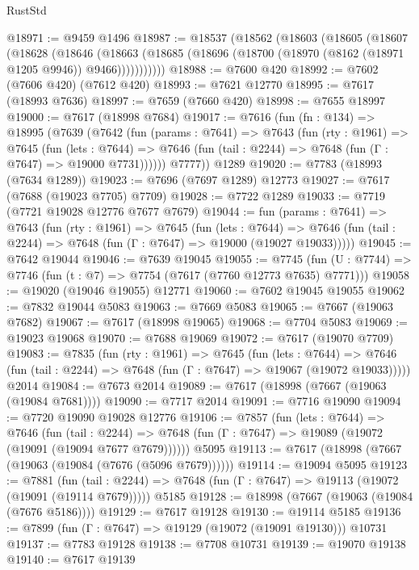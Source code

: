 \begin{lexlean}{RustStd}
\begin{coremodule}
@18971 := @9459 @1496
@18987 := @18537
    (@18562
      (@18603
        (@18605
          (@18607
            (@18628
              (@18646
                (@18663
                  (@18685 (@18696 (@18700 (@18970 (@8162 (@18971 @1205 @9946)) @9466)))))))))))
@18988 := @7600 @420
@18992 := @7602 (@7606 @420) (@7612 @420)
@18993 := @7621 @12770
@18995 := @7617 (@18993 @7636)
@18997 := @7659 (@7660 @420)
@18998 := @7655 @18997
@19000 := @7617 (@18998 @7684)
@19017 := @7616
    (fun (fn : @134) =>
    @18995
      (@7639
        (@7642
          (fun (params : @7641) =>
          @7643
            (fun (rty : @1961) =>
            @7645
              (fun (lets : @7644) =>
              @7646 (fun (tail : @2244) => @7648 (fun (Γ : @7647) => @19000 @7731))))))
        @7777))
    @1289
@19020 := @7783 (@18993 (@7634 @1289))
@19023 := @7696 (@7697 @1289) @12773
@19027 := @7617 (@7688 (@19023 @7705) @7709)
@19028 := @7722 @1289
@19033 := @7719 (@7721 @19028 @12776 @7677 @7679)
@19044 := fun (params : @7641) =>
  @7643
    (fun (rty : @1961) =>
    @7645
      (fun (lets : @7644) =>
      @7646 (fun (tail : @2244) => @7648 (fun (Γ : @7647) => @19000 (@19027 @19033)))))
@19045 := @7642 @19044
@19046 := @7639 @19045
@19055 := @7745
    (fun (U : @7744) => @7746 (fun (t : @7) => @7754 (@7617 (@7760 @12773 @7635) @7771)))
@19058 := @19020 (@19046 @19055) @12771
@19060 := @7602 @19045 @19055
@19062 := @7832 @19044 @5083
@19063 := @7669 @5083
@19065 := @7667 (@19063 @7682)
@19067 := @7617 (@18998 @19065)
@19068 := @7704 @5083
@19069 := @19023 @19068
@19070 := @7688 @19069
@19072 := @7617 (@19070 @7709)
@19083 := @7835
    (fun (rty : @1961) =>
    @7645
      (fun (lets : @7644) =>
      @7646 (fun (tail : @2244) => @7648 (fun (Γ : @7647) => @19067 (@19072 @19033)))))
    @2014
@19084 := @7673 @2014
@19089 := @7617 (@18998 (@7667 (@19063 (@19084 @7681))))
@19090 := @7717 @2014
@19091 := @7716 @19090
@19094 := @7720 @19090 @19028 @12776
@19106 := @7857
    (fun (lets : @7644) =>
    @7646
      (fun (tail : @2244) =>
      @7648 (fun (Γ : @7647) => @19089 (@19072 (@19091 (@19094 @7677 @7679))))))
    @5095
@19113 := @7617 (@18998 (@7667 (@19063 (@19084 (@7676 (@5096 @7679))))))
@19114 := @19094 @5095
@19123 := @7881
    (fun (tail : @2244) => @7648 (fun (Γ : @7647) => @19113 (@19072 (@19091 (@19114 @7679)))))
    @5185
@19128 := @18998 (@7667 (@19063 (@19084 (@7676 @5186))))
@19129 := @7617 @19128
@19130 := @19114 @5185
@19136 := @7899 (fun (Γ : @7647) => @19129 (@19072 (@19091 @19130))) @10731
@19137 := @7783 @19128
@19138 := @7708 @10731
@19139 := @19070 @19138
@19140 := @7617 @19139

\end{coremodule}
\end{lexlean}
